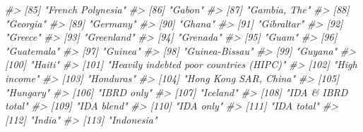 \documentclass[
  xelatex, ja=standard]{bxjsbook}
\newenvironment{Shaded}{\begin{snugshade}}{\end{snugshade}}
\newcommand{\CommentTok}[1]{\textcolor[rgb]{0.56,0.35,0.01}{\textit{#1}}}
\theoremstyle{definition}
\theoremstyle{definition}
\theoremstyle{definition}
\theoremstyle{definition}
\theoremstyle{remark}
\begin{document}
\begin{Shaded}
\begin{Highlighting}[]
\CommentTok{\#\textgreater{}  [85] "French Polynesia"                                    }
\CommentTok{\#\textgreater{}  [86] "Gabon"                                               }
\CommentTok{\#\textgreater{}  [87] "Gambia, The"                                         }
\CommentTok{\#\textgreater{}  [88] "Georgia"                                             }
\CommentTok{\#\textgreater{}  [89] "Germany"                                             }
\CommentTok{\#\textgreater{}  [90] "Ghana"                                               }
\CommentTok{\#\textgreater{}  [91] "Gibraltar"                                           }
\CommentTok{\#\textgreater{}  [92] "Greece"                                              }
\CommentTok{\#\textgreater{}  [93] "Greenland"                                           }
\CommentTok{\#\textgreater{}  [94] "Grenada"                                             }
\CommentTok{\#\textgreater{}  [95] "Guam"                                                }
\CommentTok{\#\textgreater{}  [96] "Guatemala"                                           }
\CommentTok{\#\textgreater{}  [97] "Guinea"                                              }
\CommentTok{\#\textgreater{}  [98] "Guinea{-}Bissau"                                       }
\CommentTok{\#\textgreater{}  [99] "Guyana"                                              }
\CommentTok{\#\textgreater{} [100] "Haiti"                                               }
\CommentTok{\#\textgreater{} [101] "Heavily indebted poor countries (HIPC)"              }
\CommentTok{\#\textgreater{} [102] "High income"                                         }
\CommentTok{\#\textgreater{} [103] "Honduras"                                            }
\CommentTok{\#\textgreater{} [104] "Hong Kong SAR, China"                                }
\CommentTok{\#\textgreater{} [105] "Hungary"                                             }
\CommentTok{\#\textgreater{} [106] "IBRD only"                                           }
\CommentTok{\#\textgreater{} [107] "Iceland"                                             }
\CommentTok{\#\textgreater{} [108] "IDA \& IBRD total"                                    }
\CommentTok{\#\textgreater{} [109] "IDA blend"                                           }
\CommentTok{\#\textgreater{} [110] "IDA only"                                            }
\CommentTok{\#\textgreater{} [111] "IDA total"                                           }
\CommentTok{\#\textgreater{} [112] "India"                                               }
\CommentTok{\#\textgreater{} [113] "Indonesia"                                           }

\end{Highlighting}
\end{Shaded}
\end{document}
